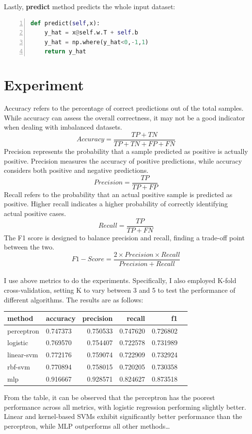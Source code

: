 \documentclass[10pt,twocolumn,letterpaper]{article}
\begin{document}
Lastly, \textbf{predict} method predicts the whole input dataset:
\begin{lstlisting}[language={python},numbers=left,tabsize=2]
def predict(self,x):
	y_hat = x@self.w.T + self.b
	y_hat = np.where(y_hat<0,-1,1)
	return y_hat
\end{lstlisting}

\section{Experiment}
Accuracy refers to the percentage of correct predictions out of the total samples. While accuracy can assess the overall correctness, it may not be a good indicator when dealing with imbalanced datasets.
\begin{equation}
	Accuracy = \frac{TP+TN}{TP+TN+FP+FN}
\end{equation}
Precision represents the probability that a sample predicted as positive is actually positive. Precision measures the accuracy of positive predictions, while accuracy considers both positive and negative predictions.
\begin{equation}
	Precision = \frac{TP}{TP+FP}
\end{equation}
Recall refers to the probability that an actual positive sample is predicted as positive. Higher recall indicates a higher probability of correctly identifying actual positive cases.
\begin{equation}
	Recall = \frac{TP}{TP+FN}
\end{equation}
The F1 score is designed to balance precision and recall, finding a trade-off point between the two.
\begin{equation}
	F1-Score = \frac{2\times Precision\times Recall}{Precision+Recall}
\end{equation}
\\
I use above metrics to do the experiments. Specifically, I also employed K-fold cross-validation, setting K to vary between 3 and 5 to test the performance of different algorithms. The results are as follows:
\begin{tabular}{llrrrr}
	\toprule
	method     & accuracy & precision & recall   & f1       \\
	\midrule
	perceptron & 0.747373 & 0.750533  & 0.747620 & 0.726802 \\
	logistic   & 0.769570 & 0.754407  & 0.722578 & 0.731989 \\
	linear-svm & 0.772176 & 0.759074  & 0.722909 & 0.732924 \\
	rbf-svm    & 0.770894 & 0.758015  & 0.720205 & 0.730358 \\
	mlp        & 0.916667 & 0.928571  & 0.824627 & 0.873518 \\
	\bottomrule
\end{tabular}
From the table, it can be observed that the perceptron has the poorest performance across all metrics, with logistic regression performing slightly better. Linear and kernel-based SVMs exhibit significantly better performance than the perceptron, while MLP outperforms all other methods\dots
\end{document}
